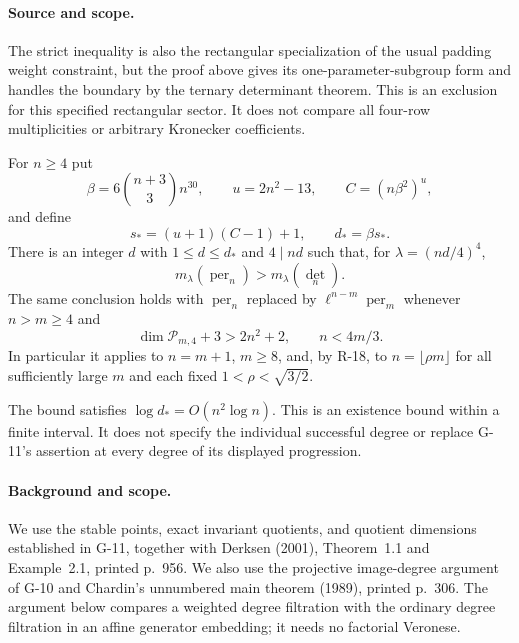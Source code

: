 \paragraph{Source and scope.}
The strict inequality is also the rectangular specialization
of the usual padding weight constraint, but the proof above
gives its one-parameter-subgroup form and handles the
boundary by the ternary determinant theorem. This is an
exclusion for this specified rectangular sector. It does
not compare all four-row multiplicities or arbitrary
Kronecker coefficients.

\begin{proposition}\label{G-13}
For $n\geq4$ put
\[
 \beta=6\binom{n+3}{3}n^{30},\qquad u=2n^2-13,\qquad
 C=(n\beta^2)^u,
\]
and define
\begin{equation}\label{G13:first-bound}
 s_*=(u+1)(C-1)+1,\qquad d_* = \beta s_*.
\end{equation}
There is an integer $d$ with $1\leq d\leq d_*$ and $4\mid nd$
such that, for $\lambda=(nd/4)^4$,
\[
 m_\lambda(\operatorname{per}_n)>m_\lambda(\det_n).
\]
The same conclusion holds with $\operatorname{per}_n$ replaced by
$\ell^{n-m}\operatorname{per}_m$ whenever $n>m\geq4$ and
\[
 \dim\mathcal P_{m,4}+3>2n^2+2,
 \qquad n<4m/3.
\]
In particular it applies to $n=m+1$, $m\geq8$, and, by R-18,
to $n=\lfloor\rho m\rfloor$ for all sufficiently large $m$
and each fixed $1<\rho<\sqrt{3/2}$.

The bound satisfies $\log d_*=O(n^2\log n)$. This is an
existence bound within a finite interval. It does not specify
the individual successful degree or replace G-11's assertion
at every degree of its displayed progression.
\end{proposition}

\paragraph{Background and scope.}
We use the stable points, exact invariant quotients, and quotient
dimensions established in G-11, together with Derksen (2001),
Theorem~1.1 and Example~2.1, printed p.~956. We also use the
projective image-degree argument of G-10 and Chardin's
unnumbered main theorem (1989), printed p.~306. The argument
below compares a weighted degree filtration with the ordinary
degree filtration in an affine generator embedding; it needs
no factorial Veronese.

